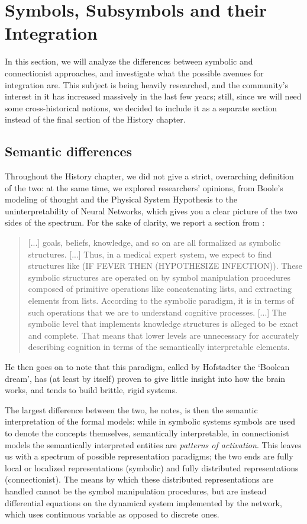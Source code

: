 \documentclass[../main.tex]{subfiles}
\begin{document}
\section{Symbols, Subsymbols and their Integration}

In this section, we will analyze the differences between symbolic and connectionist approaches, and investigate what the possible avenues for integration are. This subject is being heavily researched, and the community's interest in it has increased massively in the last few years; still, since we will need some cross-historical notions, we decided to include it as a separate section instead of the final section of the History chapter.

\subsection{Semantic differences}
Throughout the History chapter, we did not give a strict, overarching definition of the two: at the same time, we explored researchers' opinions, from Boole's modeling of thought and the Physical System Hypothesis to the uninterpretability of Neural Networks, which gives you a clear picture of the two sides of the spectrum. For the sake of clarity, we report a section from \cite{smolenskyConnectionistAISymbolic1987}:
\begin{quote}
    [...] goals, beliefs, knowledge, and so on are all formalized as symbolic structures. [...] Thus, in a medical expert system, we expect to find structures like (IF FEVER THEN (HYPOTHESIZE INFECTION)). These symbolic structures are operated on by symbol manipulation procedures composed of primitive operations like concatenating lists, and extracting elements from lists. According to the symbolic paradigm, it is in terms of such operations that we are to understand cognitive processes. [...] The symbolic level that implements knowledge structures is alleged to be exact and complete. That means that lower levels are unnecessary for accurately describing cognition in terms of the semantically interpretable elements.
\end{quote}

He then goes on to note that this paradigm, called by Hofstadter the `Boolean dream', has (at least by itself) proven to give little insight into how the brain works, and tends to build brittle, rigid systems.

The largest difference between the two, he notes, is then the semantic interpretation of the formal models: while in symbolic systems symbols are used to denote the concepts themselves, semantically interpretable, in connectionist models the semantically interpreted entities are \textit{patterns of activation}. This leaves us with a spectrum of possible representation paradigms; the two ends are fully local or localized representations (symbolic) and fully distributed representations (connectionist). The means by which these distributed representations are handled cannot be the symbol manipulation procedures, but are instead differential equations on the dynamical system implemented by the network, which uses continuous variable as opposed to discrete ones.
\end{document}
